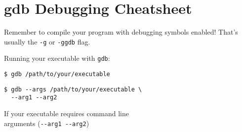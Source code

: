\documentclass[10pt, a4paper, english, parskip, twocolumn]{scrartcl}
\newcommand{\code}[1]{\texttt{#1}}
\newcommand{\ddash}{-{}-}
\newcommand{\gdbsection}[1]{\begin{mdframed}[frametitlebackgroundcolor=bittersweet,style=section,
frametitle=#1]\end{mdframed}}
\begin{document}
\section*{gdb Debugging Cheatsheet}




\gdbsection{running gdb}

Remember to compile your program with debugging symbols enabled!
That's usually the \code{-g} or \code{-ggdb} flag.

Running your executable with \code{gdb}:
%
\begin{lstlisting}[belowskip=0pt]
$ gdb /path/to/your/executable
\end{lstlisting}
%
\begin{lstlisting}[belowskip=-0.8 \baselineskip]
$ gdb --args /path/to/your/executable \
  --arg1 --arg2
\end{lstlisting}
%
\quad\quad If your executable requires command line \\
\quad\quad arguments (\code{\ddash arg1 \ddash arg2})
\end{document}
